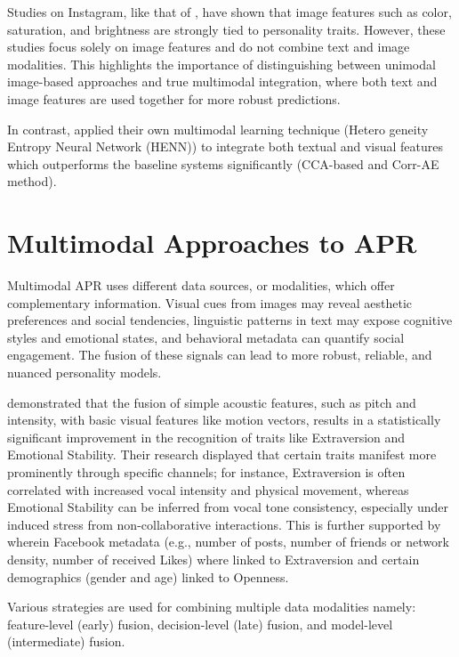 Studies on Instagram, like that of \citet{ferwerda2016}, have shown that image features such as color, saturation, and brightness are strongly tied to personality traits. However, these studies focus solely on image features and do not combine text and image modalities. This highlights the importance of distinguishing between unimodal image-based approaches and true multimodal integration, where both text and image features are used together for more robust predictions.

In contrast, \citet{Xianyu2016} applied their own multimodal learning technique (Hetero
geneity Entropy Neural Network (HENN)) to integrate both textual and visual features which outperforms the baseline systems significantly (CCA-based and Corr-AE method).

\section{Multimodal Approaches to APR}
\label{sec: MMApproaches}
Multimodal APR uses different data sources, or modalities, which offer complementary information. Visual cues from images may reveal aesthetic preferences and social tendencies, linguistic patterns in text may expose cognitive styles and emotional states, and behavioral metadata can quantify social engagement. The fusion of these signals can lead to more robust, reliable, and nuanced personality models.

\cite{batrinca_multimodal_2016} demonstrated that the fusion of simple acoustic features, such as pitch and intensity, with basic visual features like motion vectors, results in a statistically significant improvement in the recognition of traits like Extraversion and Emotional Stability. Their research displayed that certain traits manifest more prominently through specific channels; for instance, Extraversion is often correlated with increased vocal intensity and physical movement, whereas Emotional Stability can be inferred from vocal tone consistency, especially under induced stress from non-collaborative interactions. This is further supported by \cite{azucar_predicting_2018} wherein Facebook metadata (e.g., number of posts, number of
friends or network density, number of received Likes) where linked to Extraversion and certain demographics (gender and age) linked to Openness.

Various strategies are used for combining multiple data modalities namely: feature-level (early) fusion, decision-level (late) fusion, and model-level (intermediate) fusion.  

